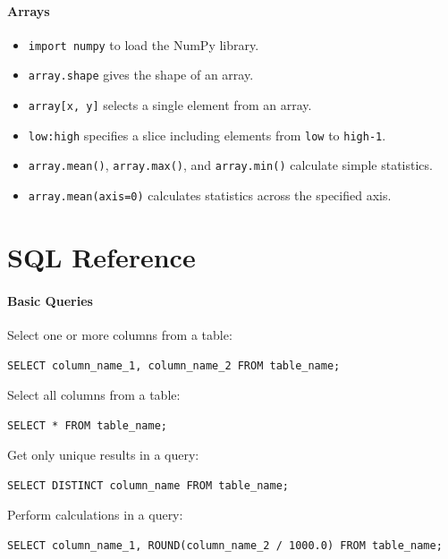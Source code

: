 \documentclass[]{book}
\begin{document}
\mbox{}\paragraph{Arrays}

\begin{itemize}
\item
  \texttt{import numpy} to load the NumPy library.
\item
  \texttt{array.shape} gives the shape of an array.
\item
  \texttt{array{[}x, y{]}} selects a single element from an array.
\item
  \texttt{low:high} specifies a slice including elements from
  \texttt{low} to \texttt{high-1}.
\item
  \texttt{array.mean()}, \texttt{array.max()}, and \texttt{array.min()}
  calculate simple statistics.
\item
  \texttt{array.mean(axis=0)} calculates statistics across the specified
  axis.
\end{itemize}

\section{SQL Reference}

\mbox{}\paragraph{Basic Queries}

Select one or more columns from a table:

\begin{verbatim}
SELECT column_name_1, column_name_2 FROM table_name;
\end{verbatim}

Select all columns from a table:

\begin{verbatim}
SELECT * FROM table_name;
\end{verbatim}

Get only unique results in a query:

\begin{verbatim}
SELECT DISTINCT column_name FROM table_name;
\end{verbatim}

Perform calculations in a query:

\begin{verbatim}
SELECT column_name_1, ROUND(column_name_2 / 1000.0) FROM table_name;
\end{verbatim}
\end{document}
